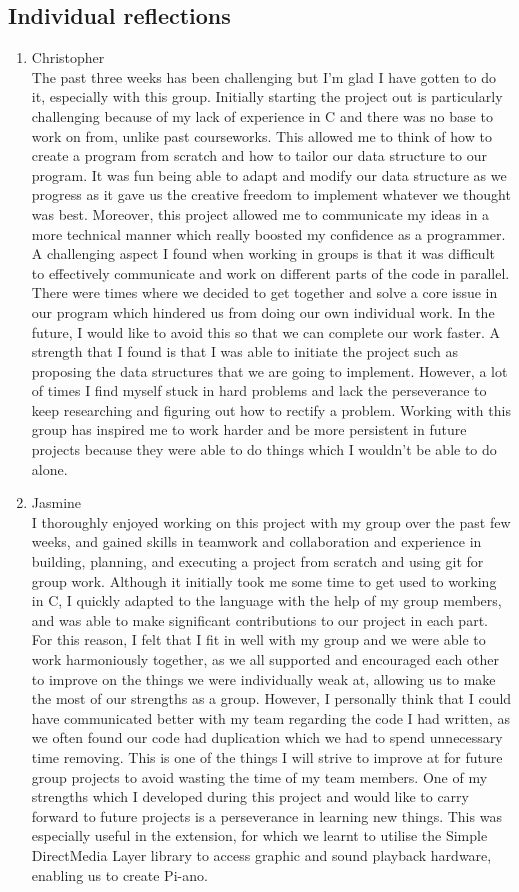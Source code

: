 \documentclass[11pt]{article}
\begin{document}
\subsection{Individual reflections} 
\begin{enumerate}
\item Christopher
\\
The past three weeks has been challenging but I'm glad I have gotten to do it, especially with this group. Initially starting the project out is particularly challenging because of my lack of experience in C and there was no base to work on from, unlike past courseworks. This allowed me to think of how to create a program from scratch and how to tailor our data structure to our program. It was fun being able to adapt and modify our data structure as we progress as it gave us the creative freedom to implement whatever we thought was best. Moreover, this project allowed me to communicate my ideas in a more technical manner which really boosted my confidence as a programmer. A challenging aspect I found when working in groups is that it was difficult to effectively communicate and work on different parts of the code in parallel. There were times where we decided to get together and solve a core issue in our program which hindered us from doing our own individual work. In the future, I would like to avoid this so that we can complete our work faster. A strength that I found is that I was able to initiate the project such as proposing the data structures that we are going to implement. However, a lot of times I find myself stuck in hard problems and lack the perseverance to keep researching and figuring out how to rectify a problem. Working with this group has inspired me to work harder and be more persistent in future projects because they were able to do things which I wouldn't be able to do alone.
\item Jasmine
\\
I thoroughly enjoyed working on this project with my group over the past few weeks, and gained skills in teamwork and collaboration and experience in building, planning, and executing a project from scratch and using git for group work. Although it initially took me some time to get used to working in C, I quickly adapted to the language with the help of my group members, and was able to make significant contributions to our project in each part. For this reason, I felt that I fit in well with my group and we were able to work harmoniously together, as we all supported and encouraged each other to improve on the things we were individually weak at, allowing us to make the most of our strengths as a group. However, I personally think that I could have communicated better with my team regarding the code I had written, as we often found our code had duplication which we had to spend unnecessary time removing. This is one of the things I will strive to improve at for future group projects to avoid wasting the time of my team members. One of my strengths which I developed during this project and would like to carry forward to future projects is a perseverance in learning new things. This was especially useful in the extension, for which we learnt to utilise the Simple DirectMedia Layer library to access graphic and sound playback hardware, enabling us to create Pi-ano.

\end{enumerate}
\end{document}
